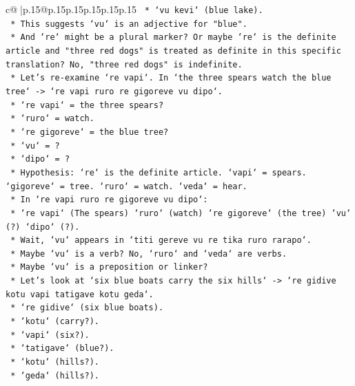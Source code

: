 \documentclass{article}
\begin{document}
{\begin{supertabular}{c@{$\;$}|p{.15\linewidth}@{}p{.15\linewidth}p{.15\linewidth}p{.15\linewidth}p{.15\linewidth}p{.15\linewidth}}
{{{\texttt{            *   `vu kevi` (blue lake).} \\
\texttt{            *   This suggests `vu` is an adjective for "blue".} \\
\texttt{            *   And `re` might be a plural marker? Or maybe `re` is the definite article and "three red dogs" is treated as definite in this specific translation? No, "three red dogs" is indefinite.} \\
\texttt{            *   Let's re{-}examine `re vapi`. In `the three spears watch the blue tree` {-}> `re vapi ruro re gigoreve vu dipo`.} \\
\texttt{                *   `re vapi` = the three spears?} \\
\texttt{                *   `ruro` = watch.} \\
\texttt{                *   `re gigoreve` = the blue tree?} \\
\texttt{                *   `vu` = ?} \\
\texttt{                *   `dipo` = ?} \\
\texttt{            *   Hypothesis: `re` is the definite article. `vapi` = spears. `gigoreve` = tree. `ruro` = watch. `veda` = hear.} \\
\texttt{            *   In `re vapi ruro re gigoreve vu dipo`:} \\
\texttt{                *   `re vapi` (The spears) `ruro` (watch) `re gigoreve` (the tree) `vu` (?) `dipo` (?).} \\
\texttt{                *   Wait, `vu` appears in `titi gereve vu re tika ruro rarapo`.} \\
\texttt{                *   Maybe `vu` is a verb? No, `ruro` and `veda` are verbs.} \\
\texttt{                *   Maybe `vu` is a preposition or linker?} \\
\texttt{                *   Let's look at `six blue boats carry the six hills` {-}> `re gidive kotu vapi tatigave kotu geda`.} \\
\texttt{                    *   `re gidive` (six blue boats).} \\
\texttt{                    *   `kotu` (carry?).} \\
\texttt{                    *   `vapi` (six?).} \\
\texttt{                    *   `tatigave` (blue?).} \\
\texttt{                    *   `kotu` (hills?).} \\
\texttt{                    *   `geda` (hills?).} \\
}}}
\end{supertabular}}
\end{document}
